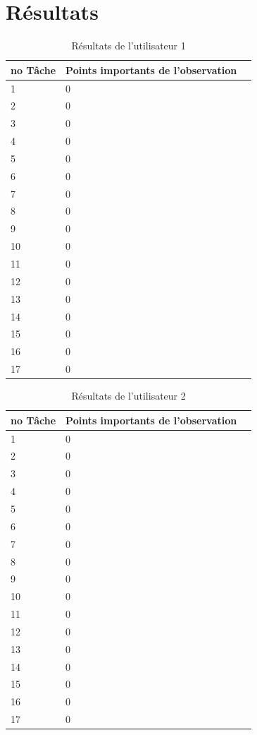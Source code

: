 \documentclass[letterpaper, oneside, 12pt, these, creativecommons]{thETS}
\begin{document}
\newpage

\section{Résultats}

\begin{table}
	\centering
	\begin{tabular}{|l|l|l|}
	\hline
	no Tâche	& Points importants de l'observation	\\ \hline
	1		& 0						\\ \hline
	2		& 0						\\ \hline
	3		& 0						\\ \hline
	4		& 0						\\ \hline
	5		& 0						\\ \hline
	6		& 0						\\ \hline
	7		& 0						\\ \hline
	8		& 0						\\ \hline
	9		& 0						\\ \hline
	10		& 0						\\ \hline
	11		& 0						\\ \hline
	12		& 0						\\ \hline
	13		& 0						\\ \hline
	14		& 0						\\ \hline
	15		& 0						\\ \hline
	16		& 0						\\ \hline
	17		& 0						\\ \hline
	\end{tabular}
	\caption{Résultats de l'utilisateur 1}
\end{table}

\newpage

\begin{table}
	\centering
	\begin{tabular}{|l|l|l|}
	\hline
	no Tâche	& Points importants de l'observation	\\ \hline
	1		& 0						\\ \hline
	2		& 0						\\ \hline
	3		& 0						\\ \hline
	4		& 0						\\ \hline
	5		& 0						\\ \hline
	6		& 0						\\ \hline
	7		& 0						\\ \hline
	8		& 0						\\ \hline
	9		& 0						\\ \hline
	10		& 0						\\ \hline
	11		& 0						\\ \hline
	12		& 0						\\ \hline
	13		& 0						\\ \hline
	14		& 0						\\ \hline
	15		& 0						\\ \hline
	16		& 0						\\ \hline
	17		& 0						\\ \hline
	\end{tabular}
	\caption{Résultats de l'utilisateur 2}
\end{table}
\end{document}
